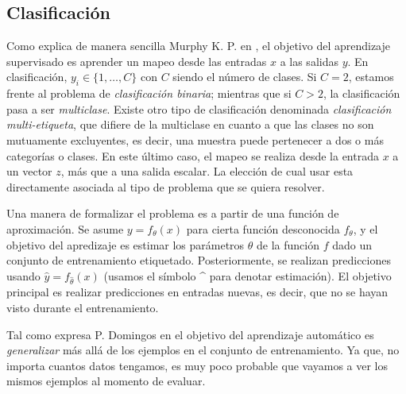\subsection{Clasificación}

		Como explica de manera sencilla Murphy K. P. en \cite{Murphy12}, el objetivo del aprendizaje supervisado es aprender un mapeo desde las entradas $x$ a las salidas $y$. En clasificación, $y_i \in \{1,\dots,C\}$ con $C$ siendo el número de clases. Si $C=2$, estamos frente al problema de \textit{clasificación binaria}; mientras que si $C>2$, la clasificación pasa a ser \textit{multiclase}. Existe otro tipo de clasificación denominada \textit{clasificación multi-etiqueta}, que difiere de la multiclase en cuanto a que las clases no son mutuamente excluyentes, es decir, una muestra puede pertenecer a dos o más categorías o clases. En este último caso, el mapeo se realiza desde la entrada $x$ a un vector $z$, más que a una salida escalar. La elección de cual usar esta directamente asociada al tipo de problema que se quiera resolver.
		
		Una manera de formalizar el problema es a partir de una función de aproximación. Se asume $y = f_{\theta}(x)$ para cierta función desconocida $f_{\theta}$, y el objetivo del apredizaje es estimar los parámetros $\theta$ de la función $f$ dado un conjunto de entrenamiento etiquetado. Posteriormente, se realizan predicciones usando $\hat{y} = f_{\hat{\theta}}(x)$ (usamos el símbolo \string^ para denotar estimación). El objetivo principal es realizar predicciones en entradas nuevas, es decir, que no se hayan visto durante el entrenamiento.
		
		Tal como expresa P. Domingos en \cite{PDomingo} el objetivo del aprendizaje automático es \textit{generalizar} más allá de los ejemplos en el conjunto de entrenamiento. Ya que, no importa cuantos datos tengamos, es muy poco probable que vayamos a ver los mismos ejemplos al momento de evaluar.

	

	
	
	
	
	
	
	
		
		
	
	
	